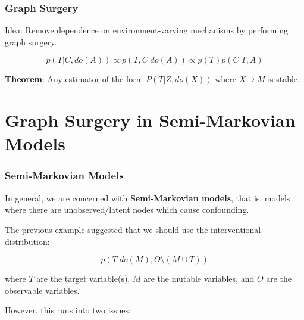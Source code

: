 \documentclass{beamer}
\begin{document}
\begin{frame}
\frametitle{Graph Surgery}
Idea: Remove dependence on environment-varying mechanisms by performing graph surgery.
\pause

\pause

\pause
$$p(T|C, do(A)) \propto p(T, C|do(A)) \propto p(T) p(C|T, A) $$

\pause
\textbf{Theorem}: Any estimator of the form $P(T|Z, do(X))$ where $X \supseteq M$ is stable.
\end{frame}

\section{Graph Surgery in Semi-Markovian Models}
\begin{frame}
\frametitle{Semi-Markovian Models}

In general, we are concerned with \textbf{Semi-Markovian models}, that is, models where there are unobserved/latent nodes which cause confounding.
\bigskip

The previous example suggested that we should use the interventional distribution:

$$p(T|do(M), O\setminus(M \cup T))$$

\medskip
where $T$ are the target variable(s), $M$ are the mutable variables, and $O$ are the observable variables.

\medskip
However, this runs into two issues:
\end{frame}
\end{document}
